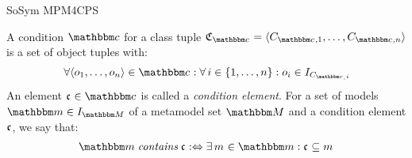 \begin{copiedFrom}{SoSym MPM4CPS}
\begin{definition}[Condition]
    A condition $\condition{c}{}$ for a class tuple $\classtuple{C}{\condition{c}{}} = \tupled{\class{C}{\condition{c}{},1}, \dots, \class{C}{\condition{c}{},n}}$ is a set of object tuples %
    with: 
    \begin{align*}
    \formulaskip &
    \forall \tupled{\object{o}{1}, \dots, \object{o}{n}} \in \condition{c}{}: \forall i \in \setted{1, \dots, n} : \object{o}{i} \in \metamodelinstances{\class{C}{\condition{c}, i}}
    \end{align*}
    An element $\conditionelement{c}{} \in \condition{c}{}$ is called a \emph{condition element}.
    For a set of models $\modelset{m} \in \metamodelinstances{\metamodelset{M}}$ of a metamodel set $\metamodelset{M}$ and %
    a condition element $\mathfrak{c}_{}$, %
    we say that: 
    \begin{align*}
        \formulaskip &
        \modelset{m} \mathtext{contains} \conditionelement{c}{} \equivalentperdefinition
        \exists \model{m}{} \in \modelset{m} : \conditionelement{c}{} \subseteq \model{m}{}
    \end{align*}
\end{definition}


\end{copiedFrom}
